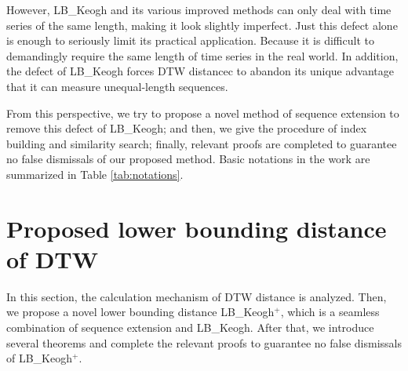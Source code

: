 \documentclass[10pt,journal,compsoc]{IEEEtran}
\begin{document}
However, LB\_Keogh and its various improved methods can only deal with time series of the same length,
making it look slightly imperfect.
Just this defect alone is enough to seriously limit its practical application.
Because it is difficult to demandingly require the same length of time series in the real world.
In addition, the defect of LB\_Keogh forces DTW distancec to abandon its unique advantage
that it can measure unequal-length sequences.

From this perspective,
we try to propose a novel method of sequence extension to remove this defect of LB\_Keogh;
and then, we give the procedure of index building and similarity search;
finally, relevant proofs are completed to guarantee no false dismissals of our proposed method.
Basic notations in the work are summarized in Table \ref{tab:notations}.


\section{Proposed lower bounding distance of DTW}\label{sec:proposed method}

In this section, the calculation mechanism of DTW distance is analyzed.
Then, we propose a novel lower bounding distance LB\_Keogh$^+$,
which is a seamless combination of sequence extension and LB\_Keogh.
After that, we introduce several theorems and complete the relevant proofs
to guarantee no false dismissals of LB\_Keogh$^+$.
\end{document}
